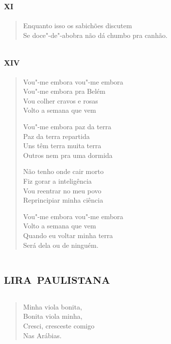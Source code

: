 {\chapter[«Enquanto isso os sabichões discutem»]{\textsc{xi}}

\begin{verse}
Enquanto isso os sabichões discutem\\
Se doce"-de"-abobra não dá chumbo pra canhão.
\end{verse}

\chapter[«Vou"-me embora vou"-me embora»]{\textsc{xiv}}

\begin{verse}
Vou"-me embora vou"-me embora\\
Vou"-me embora pra Belém\\
Vou colher cravos e rosas\\
Volto a semana que vem

Vou"-me embora paz da terra\\
Paz da terra repartida\\
Uns têm terra muita terra\\
Outros nem pra uma dormida

Não tenho onde cair morto\\
Fiz gorar a inteligência\\
Vou reentrar no meu povo\\
Reprincipiar minha ciência

Vou"-me embora vou"-me embora\\
Volto a semana que vem\\
Quando eu voltar minha terra\\
Será dela ou de ninguém.
\end{verse}

\movetooddpage
\part{\textsc{lira paulistana}}

\chapter*{}

\begin{verse}
Minha viola bonita,\\
Bonita viola minha,\\
Cresci, cresceste comigo\\
\qquad Nas Arábias.


\end{verse}}
